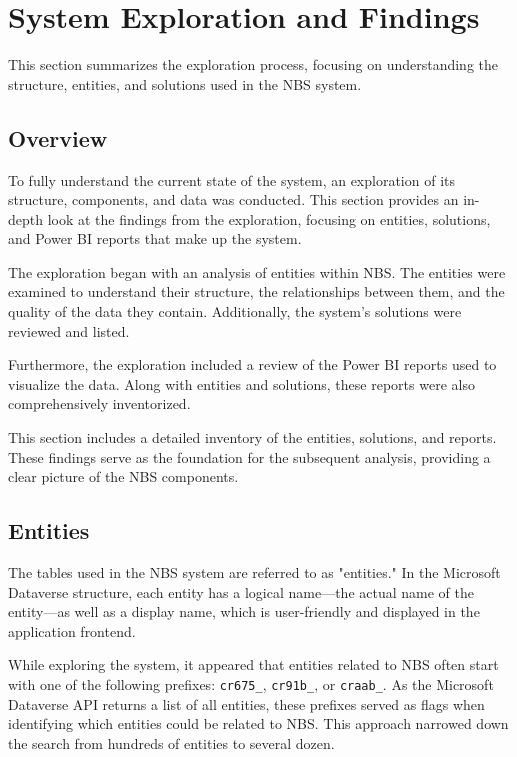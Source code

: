 \section{System Exploration and Findings}

This section summarizes the exploration process, focusing on understanding the structure, entities, and solutions used in the NBS system.

\subsection{Overview}

To fully understand the current state of the system, an exploration of its structure, components, and data was conducted. This section provides an in-depth look at the findings from the exploration, focusing on entities, solutions, and Power BI reports that make up the system.

The exploration began with an analysis of entities within NBS. The entities were examined to understand their structure, the relationships between them, and the quality of the data they contain. Additionally, the system's solutions were reviewed and listed.

\newpage

Furthermore, the exploration included a review of the Power BI reports used to visualize the data. Along with entities and solutions, these reports were also comprehensively inventorized.

This section includes a detailed inventory of the entities, solutions, and reports. These findings serve as the foundation for the subsequent analysis, providing a clear picture of the NBS components.

\subsection{Entities}

The tables used in the NBS system are referred to as "entities." In the Microsoft Dataverse structure, each entity has a logical name—the actual name of the entity—as well as a display name, which is user-friendly and displayed in the application frontend.

While exploring the system, it appeared that entities related to NBS often start with one of the following prefixes: \texttt{cr675\_}, \texttt{cr91b\_}, or \texttt{craab\_}. As the Microsoft Dataverse API returns a list of all entities, these prefixes served as flags when identifying which entities could be related to NBS. This approach narrowed down the search from hundreds of entities to several dozen.

